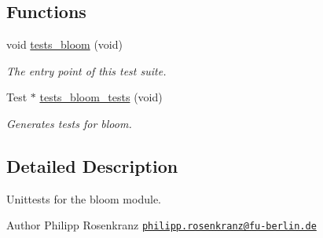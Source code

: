 \subsection*{Functions}
\begin{DoxyCompactItemize}
\item 
void \hyperlink{group__unittests_gabad6e976ec47aecf07c700f947206fdb}{tests\+\_\+bloom} (void)
\begin{DoxyCompactList}\small\item\em The entry point of this test suite. \end{DoxyCompactList}\item 
Test $\ast$ \hyperlink{group__unittests_gaaa23c5835dcd15e549fc6bf7227a928e}{tests\+\_\+bloom\+\_\+tests} (void)
\begin{DoxyCompactList}\small\item\em Generates tests for bloom. \end{DoxyCompactList}\end{DoxyCompactItemize}


\subsection{Detailed Description}
Unittests for the {\ttfamily bloom} module. 

\begin{DoxyAuthor}{Author}
Philipp Rosenkranz \href{mailto:philipp.rosenkranz@fu-berlin.de}{\tt philipp.\+rosenkranz@fu-\/berlin.\+de} 
\end{DoxyAuthor}
